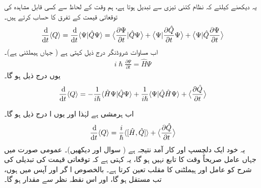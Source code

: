  یہ دیکھنے کیلئے کہ نظام کتنی تیزی سے تبدیل ہوتا ہے، ہم وقت کے لحاظ سے کسی قابل مشاہدہ  کی توقعاتی قیمت کے تفرق کا حساب کرتے ہیں۔ 
\begin{align*}
\frac{\dif}{\dif t} \langle Q \rangle = \frac{\dif}{\dif t} \langle \Psi | \hat{Q} \Psi \rangle = \big\langle \frac{\partial\Psi}{\partial t} \vert \hat{Q} \Psi \big\rangle + \big\langle \Psi \vert \frac{\partial \hat{Q}}{\partial t} \Psi \big\rangle + \big\langle \Psi \vert \hat{Q} \frac{\partial \Psi}{\partial t} \big\rangle 
\end{align*}
اب مساوات شروڈنگر درج ذیل کہتی ہے ( جہاں  ہیملٹنی ہے)۔ 
\begin{align*}
i \hslash \frac{\partial \Psi}{\partial t} = \hat{H} \Psi
\end{align*}
یوں درج ذیل ہو گا۔ 
\begin{align*}
\frac{\dif}{\dif t}\langle Q\rangle =-\frac{1}{i \hslash} \langle \hat{H}\Psi | \hat{Q} \Psi\rangle+\frac{1}{i\hslash}\langle \Psi |\hat{Q} \hat{H} \Psi\rangle +\big \langle \frac{\partial \hat{Q}}{\partial t}\big \rangle
\end{align*}

اب  ہرمشی ہے لہٰذا  اور یوں ا درج ذیل ہو گا۔
\begin{align}\label{مساوات_قواعد_شرح_تبدیلی_قابل_مشاہدہ}
\frac{\dif}{\dif t} \langle Q \rangle = \frac{i}{\hslash} \langle [ \hat{H} , \hat{Q} ] \rangle + \big\langle \frac{\partial \hat{Q}}{\partial t} \big\rangle 
\end{align}
یہ خود ایک دلچسپ اور کار آمد نتیجہ ہے ( سوال  اور  دیکھیں)۔ عمومی صورت میں جہاں عامل صریحاً وقت کا تابع نہیں ہو گا، یہ کہتی ہے کہ توقعاتی قیمت کی تبدیلی کی شرح کو عامل اور ہیملٹنی کا مقلب تعین کرتا ہے۔ بالخصوص ا گر  اور  آپس میں ہوں، تب  مستقل ہو گا، اور اس نقطہ نظر سے   مقدار ہو گا۔

